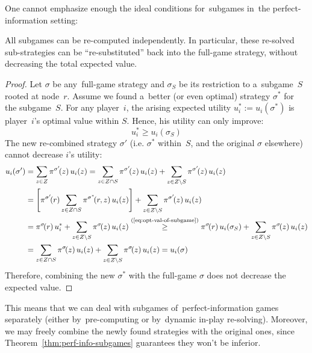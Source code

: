 One cannot emphasize enough the ideal conditions for~subgames in~the perfect-information setting:

\begin{thm}
  \label{thm:perf-info-subgames}
  All subgames can be re-computed independently.
  In particular, these re-solved sub-strategies can be ``re-substituted'' back into the full-game strategy, without decreasing the total expected value.
\end{thm}

\begin{proof}
  Let $\sigma$ be any~full-game strategy and $\sigma_S$ be its restriction to a~subgame~$S$ rooted at node~$r$.
  Assume we found a~better (or even optimal) strategy $\sigma^*$ for the subgame~$S$.
  For any player~$i$, the arising expected utility $u^*_i := u_i(\sigma^*)$ is player~$i$'s optimal value within $S$.
  Hence, his utility can only improve:
  \begin{equation}
    u^*_i \ge u_i(\sigma_S)
    \label{eq:opt-val-of-subgame}
  \end{equation}
  The new re-combined strategy $\sigma'$ (i.e. $\sigma^*$ within~$S$, and the original $\sigma$ elsewhere) cannot decrease $i$'s utility:
  \begin{align*}
    u_i(\sigma')
    &= \sum _{z \in Z} \pi^{\sigma'}\!(z) \,u_i(z)
    = \sum _{z \in Z \cap S} \pi^{\sigma'}\!(z) \,u_i(z)
    + \sum _{z \in Z \setminus S} \pi^{\sigma'}\!(z) \,u_i(z) \\
    &= \left[ \pi^{\sigma'}\!(r)\sum _{z \in Z \cap S} \pi^{\sigma^*}\!(r, z) \,u_i(z) \right]
    + \sum _{z \in Z \setminus S} \pi^{\sigma'}\!(z) \,u_i(z) \\
    &= \pi^{\sigma}\!(r) \,u_i^*
    + \sum _{z \in Z \setminus S} \pi^{\sigma}\!(z) \,u_i(z)
    \stackrel{\text{(\ref{eq:opt-val-of-subgame})}}{\ge} \pi^{\sigma}\!(r) \,u_i(\sigma_S)
    + \sum _{z \in Z \setminus S} \pi^{\sigma}\!(z) \,u_i(z) \\
    &= \sum _{z \in Z \cap S} \pi^{\sigma}\!(z) \,u_i(z)
    + \sum _{z \in Z \setminus S} \pi^{\sigma}\!(z) \,u_i(z)
    = u_i(\sigma)
  \end{align*}
  Therefore, combining the new $\sigma^*$ with the full-game $\sigma$ does not decrease the expected value.
\end{proof}

This means that we can deal with subgames of~perfect-information games separately (either by~pre-computing or by~dynamic in-play re-solving).
Moreover, we may freely combine the newly found strategies with the original ones, since Theorem~\ref{thm:perf-info-subgames} guarantees they won't be inferior.

